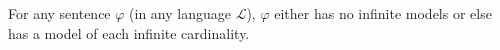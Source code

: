 For any sentence $\varphi$ (in any language $\mathcal{L}$), $\varphi$ either has no infinite models or else has a model of each infinite cardinality.
